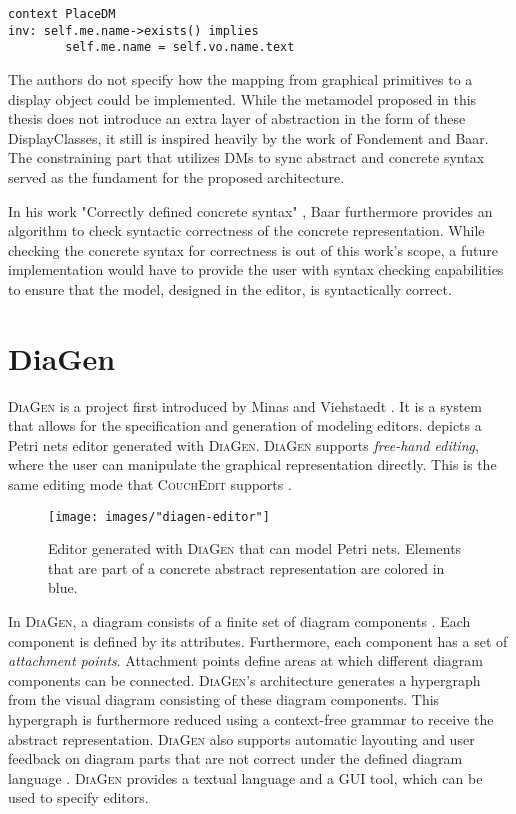 \begin{lstlisting}[language=OCL,captionpos=b,caption={OCL Invariant that syncs the name attribute of place DisplayClasses and place model elements.},label={lst:ocl-inv}]
context PlaceDM
inv: self.me.name->exists() implies
        self.me.name = self.vo.name.text
\end{lstlisting}

The authors do not specify how the mapping from graphical primitives to a display object could be implemented. While the metamodel proposed in this thesis does not introduce an extra layer of abstraction in the form of these DisplayClasses, it still is inspired heavily by the work of Fondement and Baar. The constraining part that utilizes DMs to sync abstract and concrete syntax served as the fundament for the proposed architecture.

In his work "Correctly defined concrete syntax" \cite{baar_correctly_2008}, Baar furthermore provides an algorithm to check syntactic correctness of the concrete representation. While checking the concrete syntax for correctness is out of this work's scope, a future implementation would have to provide the user with syntax checking capabilities to ensure that the model, designed in the editor, is syntactically correct.


\section{DiaGen}
\label{sec:diagen}
\textsc{DiaGen} is a project first introduced by Minas and Viehstaedt \cite{minas_diagen_1995}. It is a system that allows for the specification and generation of modeling editors.  depicts a Petri nets editor generated with \textsc{DiaGen}. \textsc{DiaGen} supports \emph{free-hand editing}, where the user can manipulate the graphical representation directly. This is the same editing mode that \textsc{CouchEdit} supports \cite{nachreiner_couchedit_2020}.

\begin{figure}[h]
  \centering
  \texttt{[image: images/"diagen-editor"]}
  \caption{Editor generated with \textsc{DiaGen} that can model Petri nets. Elements that are part of a concrete abstract representation are colored in blue.}
  \label{fig:diagen-editor}
  \end{figure}

In \textsc{DiaGen}, a diagram consists of a finite set of diagram components \cite{minas_concepts_2002}. Each component is defined by its attributes. Furthermore, each component has a set of \emph{attachment points}. Attachment points define areas at which different diagram components can be connected. \textsc{DiaGen}'s architecture generates a hypergraph from the visual diagram consisting of these diagram components. This hypergraph is furthermore reduced using a context-free grammar to receive the abstract representation. \textsc{DiaGen} also supports automatic layouting and user feedback on diagram parts that are not correct under the defined diagram language \cite{minas_concepts_2002}. \textsc{DiaGen} provides a textual language and a GUI tool, which can be used to specify editors. 

